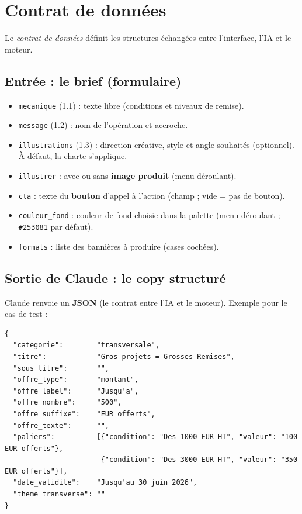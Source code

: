 \documentclass[11pt,a4paper]{article}
\begin{document}
\section{Contrat de données}
Le \emph{contrat de données} définit les structures échangées entre l'interface,
l'IA et le moteur.

\subsection{Entrée : le brief (formulaire)}
\begin{itemize}[leftmargin=1.4em]
  \item \texttt{mecanique} (1.1) : texte libre (conditions et niveaux de remise).
  \item \texttt{message} (1.2) : nom de l'opération et accroche.
  \item \texttt{illustrations} (1.3) : direction créative, style et angle souhaités
        (optionnel). À défaut, la charte s'applique.
  \item \texttt{illustrer} : avec ou sans \textbf{image produit} (menu déroulant).
  \item \texttt{cta} : texte du \textbf{bouton} d'appel à l'action (champ ; vide = pas
        de bouton).
  \item \texttt{couleur\_fond} : couleur de fond choisie dans la palette (menu
        déroulant ; \texttt{\#253081} par défaut).
  \item \texttt{formats} : liste des bannières à produire (cases cochées).
\end{itemize}

\subsection{Sortie de Claude : le copy structuré}
Claude renvoie un \textbf{JSON} (le contrat entre l'IA et le moteur). Exemple
pour le cas de test :

\begin{lstlisting}
{
  "categorie":        "transversale",
  "titre":            "Gros projets = Grosses Remises",
  "sous_titre":       "",
  "offre_type":       "montant",
  "offre_label":      "Jusqu'a",
  "offre_nombre":     "500",
  "offre_suffixe":    "EUR offerts",
  "offre_texte":      "",
  "paliers":          [{"condition": "Des 1000 EUR HT", "valeur": "100 EUR offerts"},
                       {"condition": "Des 3000 EUR HT", "valeur": "350 EUR offerts"}],
  "date_validite":    "Jusqu'au 30 juin 2026",
  "theme_transverse": ""
}
\end{lstlisting}
\end{document}
